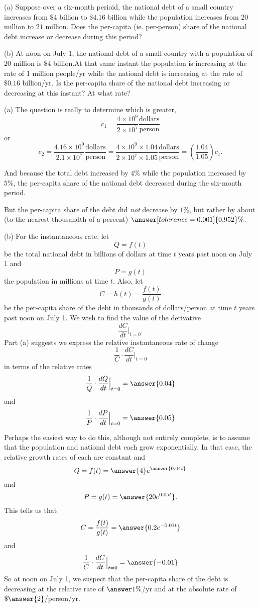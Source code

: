 \documentclass{ximera}
\begin{document}
\begin{question} \label{Ex:Dfggt4ttggg}
(a) Suppose over a six-month perioid, the national debt of a small country increases from $\$4$ billion to $\$4.16$ billion while the population increases from $20$ million to $21$ million. Does the per-capita (ie. per-person) share of the national debt increase or decrease during this period? 

(b) At noon on July 1, the national debt of a small country with a population of $20$ million is $\$4$ billion.At that same instant the population is increasing at the rate of 1 million people/yr while the national debt is increasing at the rate of $\$0.16$ billion/yr. Is the per-capita share of the national debt increasing or decreasing at this instant? At what rate?

\begin{explanation}
(a) The question is really to determine which is greater, 
\[
       c_1 =  \frac{4 \times 10^9}{2 \times 10^7} \frac{\text{dollars}}{\text{person}}
\]
or
\[
      c_2 =   \frac{4.16 \times 10^9}{2.1 \times 10^7} \frac{\text{dollars}}{\text{person}} = \frac{4 \times 10^9 \times 1.04}{2 \times 10^7\times 1.05} \frac{\text{dollars}}{\text{person}} = \left( \frac{1.04}{1.05} \right)c_1 .
\]

And because the total debt increased by $4\%$ while the population increased by $5\%$, the per-capita share of the national debt decreased during the six-month period.

But the per-capita share of the debt did \emph{not} decrease by $1\%$, but rather by about (to the nearest thousandth of a percent) $\answer[tolerance=0.001]{0.952}\%$.

(b) For the instantaneous rate, let
\[
         Q = f(t)
\]
be the total national debt in billions of dollars at time $t$ years past noon on July 1 and
\[
     P = g(t)
\]
the population in millions at time $t$. Also, let
\[
       C = h(t) = \frac{f(t)}{g(t)}
\]
be the per-capita share of the debt in thousands of dollars/person at time $t$ years past noon on July 1. We wish to find the value of the derivative
\[
      \frac{dC}{dt} \Big|_{t=0} .
\]
Part (a) suggests we express the relative instantaneous rate of change
\[
     \frac{1}{C} \cdot \frac{dC}{dt} \Big|_{t=0}
\]
in terms of the relative rates
\[
    \frac{1}{Q} \cdot \frac{dQ}{dt}\Big|_{t=0} = \answer{0.04} 
\]
and
\[
   \frac{1}{P} \cdot \frac{dP}{dt}\Big|_{t=0} = \answer{0.05}
\]

Perhaps the easiest way to do this, although not entirely complete, is to assume that the population and national debt each grow exponentially. In that case, the relative growth rates of each are constant and 
\[
    Q = f(t) = \answer{4}e^{\answer{0.04t}}
\]
and 
\[
      P = g(t) = \answer{20e^{0.05t}} .
\]
This tells us that
\[
       C = \frac{f(t)}{g(t)} = \answer{0.2 e^{-0.01t}}
\]
and
\[
       \frac{1}{C} \cdot \frac{dC}{dt} \Big|_{t=0} = \answer{-0.01} 
\]
So at noon on July 1, we suspect that the per-capita share of the debt is decreasing at the relative rate of $\answer{1\%}$/yr
and at the absolute rate of $\$\answer{2}$/person/yr.


\end{explanation}
\end{question}
\end{document}
